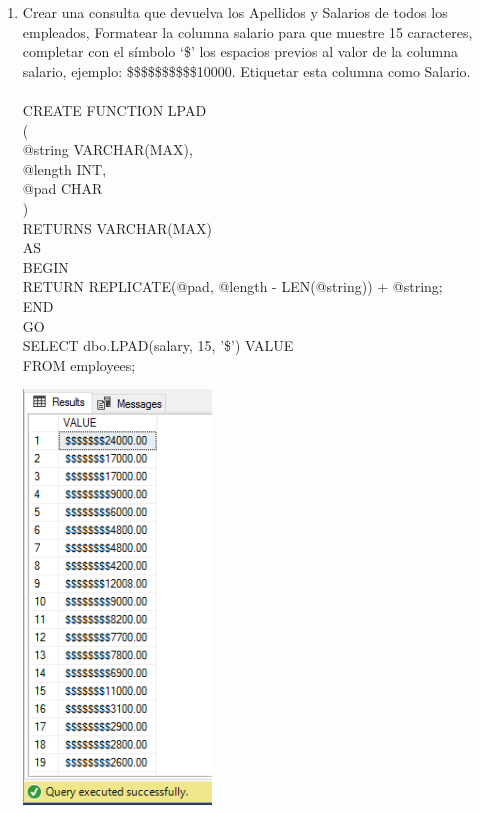 \begin{enumerate}[1.]
	\item Crear una consulta que devuelva los Apellidos y Salarios de todos los empleados, Formatear la columna salario para que muestre 15 caracteres, completar con el símbolo ‘\$’ los espacios previos al valor de la columna salario, ejemplo: \$\$\$\$\$\$\$\$\$\$10000. Etiquetar esta columna como Salario.
	\\
	\\CREATE FUNCTION LPAD
	\\(
	\\ @string VARCHAR(MAX), 
	\\@length INT,          
	\\@pad CHAR             
	\\)
	\\RETURNS VARCHAR(MAX)
	\\AS
	\\BEGIN
	    \\RETURN REPLICATE(@pad, @length - LEN(@string)) + @string;
	\\END
	\\GO
	\\SELECT dbo.LPAD(salary, 15, '\$') VALUE
	\\FROM employees;
	\begin{center}
		\includegraphics[width=5cm]{./Imagenes/actividad_05_07}
	\end{center}


\end{enumerate}
